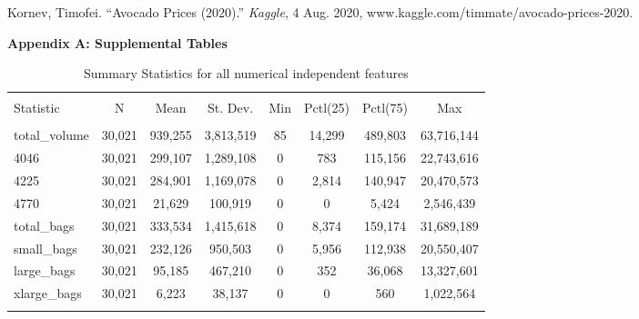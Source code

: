 \documentclass[11pt]{article}\usepackage[]{graphicx}\usepackage[]{color}
\begin{document}
\noindent [5] Kornev, Timofei. “Avocado Prices (2020).” {\em Kaggle}, 4 Aug. 2020, www.kaggle.com/timmate/avocado-prices-2020. 


\hfill \break


\clearpage
\newpage
\noindent \Large{{\bf Appendix A: Supplemental Tables}}

\begin{center}

\begin{table}[H] \centering 
  \caption{Summary Statistics for all numerical independent features} 
  \label{desc_stat_ind} 
\begin{tabular}{@{\extracolsep{5pt}}lccccccc} 
\\[-1.8ex]\hline 
\hline \\[-1.8ex] 
Statistic & \multicolumn{1}{c}{N} & \multicolumn{1}{c}{Mean} & \multicolumn{1}{c}{St. Dev.} & \multicolumn{1}{c}{Min} & \multicolumn{1}{c}{Pctl(25)} & \multicolumn{1}{c}{Pctl(75)} & \multicolumn{1}{c}{Max} \\ 
\hline \\[-1.8ex] 
total\_volume & 30,021 & 939,255 & 3,813,519 & 85 & 14,299 & 489,803 & 63,716,144 \\ 
4046 & 30,021 & 299,107 & 1,289,108 & 0 & 783 & 115,156 & 22,743,616 \\ 
4225 & 30,021 & 284,901 & 1,169,078 & 0 & 2,814 & 140,947 & 20,470,573 \\ 
4770 & 30,021 & 21,629 & 100,919 & 0 & 0 & 5,424 & 2,546,439 \\ 
total\_bags & 30,021 & 333,534 & 1,415,618 & 0 & 8,374 & 159,174 & 31,689,189 \\ 
small\_bags & 30,021 & 232,126 & 950,503 & 0 & 5,956 & 112,938 & 20,550,407 \\ 
large\_bags & 30,021 & 95,185 & 467,210 & 0 & 352 & 36,068 & 13,327,601 \\ 
xlarge\_bags & 30,021 & 6,223 & 38,137 & 0 & 0 & 560 & 1,022,564 \\ 
\hline \\[-1.8ex] 
\end{tabular} 
\end{table} 

\end{center}
\end{document}

